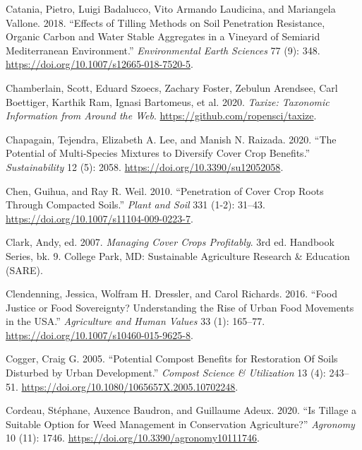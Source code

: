 \documentclass[
  12pt,
]{article}
\newlength{\cslhangindent}
\newlength{\cslentryspacingunit} %
\newenvironment{CSLReferences}[2] %
 {%
  \setlength{\parindent}{0pt}
  \ifodd #1
  \let\oldpar\par
  \def\par{\hangindent=\cslhangindent\oldpar}
  \fi
  \setlength{\parskip}{#2\cslentryspacingunit}
 }%
 {}
\begin{document}
\begin{CSLReferences}{1}{0}
\leavevmode{}%
Catania, Pietro, Luigi Badalucco, Vito Armando Laudicina, and Mariangela Vallone. 2018. {``Effects of Tilling Methods on Soil Penetration Resistance, Organic Carbon and Water Stable Aggregates in a Vineyard of Semiarid {Mediterranean} Environment.''} \emph{Environmental Earth Sciences} 77 (9): 348. \url{https://doi.org/10.1007/s12665-018-7520-5}.

\leavevmode{}%
Chamberlain, Scott, Eduard Szoecs, Zachary Foster, Zebulun Arendsee, Carl Boettiger, Karthik Ram, Ignasi Bartomeus, et al. 2020. \emph{Taxize: Taxonomic Information from Around the Web}. \url{https://github.com/ropensci/taxize}.

\leavevmode{}%
Chapagain, Tejendra, Elizabeth A. Lee, and Manish N. Raizada. 2020. {``The {Potential} of {Multi-Species Mixtures} to {Diversify Cover Crop Benefits}.''} \emph{Sustainability} 12 (5): 2058. \url{https://doi.org/10.3390/su12052058}.

\leavevmode{}%
Chen, Guihua, and Ray R. Weil. 2010. {``Penetration of Cover Crop Roots Through Compacted Soils.''} \emph{Plant and Soil} 331 (1-2): 31--43. \url{https://doi.org/10.1007/s11104-009-0223-7}.

\leavevmode{}%
Clark, Andy, ed. 2007. \emph{Managing Cover Crops Profitably}. 3rd ed. Handbook Series, bk. 9. {College Park, MD}: {Sustainable Agriculture Research \& Education (SARE)}.

\leavevmode{}%
Clendenning, Jessica, Wolfram H. Dressler, and Carol Richards. 2016. {``Food Justice or Food Sovereignty? {Understanding} the Rise of Urban Food Movements in the {USA}.''} \emph{Agriculture and Human Values} 33 (1): 165--77. \url{https://doi.org/10.1007/s10460-015-9625-8}.

\leavevmode{}%
Cogger, Craig G. 2005. {``Potential {Compost Benefits} for {Restoration Of Soils Disturbed} by {Urban Development}.''} \emph{Compost Science \& Utilization} 13 (4): 243--51. \url{https://doi.org/10.1080/1065657X.2005.10702248}.

\leavevmode{}%
Cordeau, Stéphane, Auxence Baudron, and Guillaume Adeux. 2020. {``Is {Tillage} a {Suitable Option} for {Weed Management} in {Conservation Agriculture}?''} \emph{Agronomy} 10 (11): 1746. \url{https://doi.org/10.3390/agronomy10111746}.


\end{CSLReferences}
\end{document}
